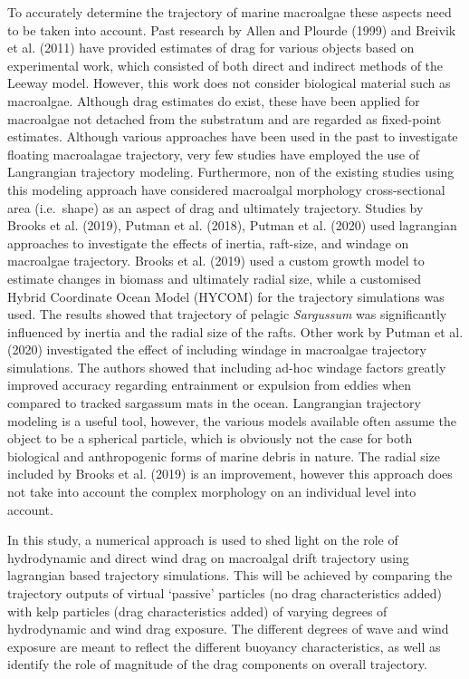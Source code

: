 \documentclass[
]{article}
\begin{document}
To accurately determine the trajectory of marine macroalgae these
aspects need to be taken into account. Past research by Allen and
Plourde (1999) and Breivik et al. (2011) have provided estimates of drag
for various objects based on experimental work, which consisted of both
direct and indirect methods of the Leeway model. However, this work does
not consider biological material such as macroalgae. Although drag
estimates do exist, these have been applied for macroalgae not detached
from the substratum and are regarded as fixed-point estimates. Although
various approaches have been used in the past to investigate floating
macroalagae trajectory, very few studies have employed the use of
Langrangian trajectory modeling. Furthermore, non of the existing
studies using this modeling approach have considered macroalgal
morphology cross-sectional area (i.e.~shape) as an aspect of drag and
ultimately trajectory. Studies by Brooks et al. (2019), Putman et al.
(2018), Putman et al. (2020) used lagrangian approaches to investigate
the effects of inertia, raft-size, and windage on macroalgae trajectory.
Brooks et al. (2019) used a custom growth model to estimate changes in
biomass and ultimately radial size, while a customised Hybrid Coordinate
Ocean Model (HYCOM) for the trajectory simulations was used. The results
showed that trajectory of pelagic \emph{Sargussum} was significantly
influenced by inertia and the radial size of the rafts. Other work by
Putman et al. (2020) investigated the effect of including windage in
macroalgae trajectory simulations. The authors showed that including
ad-hoc windage factors greatly improved accuracy regarding entrainment
or expulsion from eddies when compared to tracked sargassum mats in the
ocean. Langrangian trajectory modeling is a useful tool, however, the
various models available often assume the object to be a spherical
particle, which is obviously not the case for both biological and
anthropogenic forms of marine debris in nature. The radial size included
by Brooks et al. (2019) is an improvement, however this approach does
not take into account the complex morphology on an individual level into
account.

In this study, a numerical approach is used to shed light on the role of
hydrodynamic and direct wind drag on macroalgal drift trajectory using
lagrangian based trajectory simulations. This will be achieved by
comparing the trajectory outputs of virtual `passive' particles (no drag
characteristics added) with kelp particles (drag characteristics added)
of varying degrees of hydrodynamic and wind drag exposure. The different
degrees of wave and wind exposure are meant to reflect the different
buoyancy characteristics, as well as identify the role of magnitude of
the drag components on overall trajectory.
\end{document}
